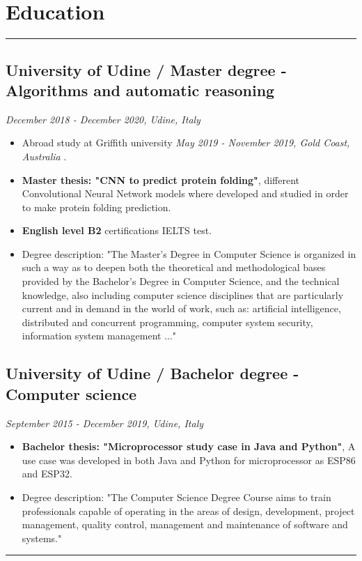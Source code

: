 \documentclass[a4paper,10pt]{article}
\begin{document}
\begin{minipage}[t]{0.25\textwidth}
        \section*{Education}
    \vspace{7.2cm} %
    \rule{0.6cm}{0.3mm}
\end{minipage}
\hfill
\begin{minipage}[t]{0.75\textwidth}
     \subsection*{University of Udine / Master degree - Algorithms and automatic reasoning }
    \textit{December 2018 - December 2020, Udine, Italy} \\
    \begin{itemize}[leftmargin=1cm]
        \item Abroad study at Griffith university \textit{May 2019 - November 2019, Gold Coast, Australia} .
        \item \textbf{Master thesis: "CNN to predict protein folding"}, different Convolutional Neural Network models where developed and studied in order to make protein folding prediction.
        \item \textbf{English level B2} certifications IELTS test. 
         \item Degree description: "The Master's Degree in Computer Science is organized in such a way as to deepen both the theoretical and methodological bases provided by the Bachelor's Degree in Computer Science, and the technical knowledge, also including computer science disciplines that are particularly current and in demand in the world of work, such as: artificial intelligence, distributed and concurrent programming, computer system security, information system management ..."
    \end{itemize}

    \subsection*{University of Udine / Bachelor degree - Computer science }
    \textit{September 2015 - December 2019, Udine, Italy} \\
        \begin{itemize}[leftmargin=1cm]
        \item \textbf{Bachelor thesis:   "Microprocessor study case in Java and Python"}, A use case was developed in both Java and Python for microprocessor as ESP86 and ESP32.
        \item Degree description: "The Computer Science Degree Course aims to train professionals capable of operating in the areas of design, development, project management, quality control, management and maintenance of software and systems."
    \end{itemize}
    \rule{\linewidth}{0.5mm}
\end{minipage}
\end{document}
